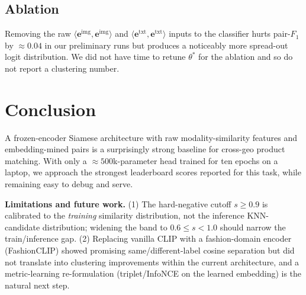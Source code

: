 \documentclass[10pt,conference]{IEEEtran}
\begin{document}
\subsection{Ablation}
Removing the raw $\langle \mathbf{e}^{\text{img}},
\mathbf{e}^{\text{img}}\rangle$ and $\langle \mathbf{e}^{\text{txt}},
\mathbf{e}^{\text{txt}}\rangle$ inputs to the classifier hurts pair-$F_1$
by $\approx 0.04$ in our preliminary runs but produces a noticeably more
spread-out logit distribution. We did not have time to retune
$\theta^\ast$ for the ablation and so do not report a clustering number.

\section{Conclusion}
\label{sec:conclusion}

A frozen-encoder Siamese architecture with raw modality-similarity features
and embedding-mined pairs is a surprisingly strong baseline for cross-geo
product matching. With only a $\approx 500$k-parameter head trained for ten
epochs on a laptop, we approach the strongest leaderboard scores reported
for this task, while remaining easy to debug and serve.

\textbf{Limitations and future work.}
(1) The hard-negative cutoff $s \ge 0.9$ is calibrated to the
\emph{training} similarity distribution, not the inference
KNN-candidate distribution; widening the band to $0.6 \le s < 1.0$ should
narrow the train/inference gap.
(2) Replacing vanilla CLIP with a fashion-domain encoder (FashionCLIP)
showed promising same/different-label cosine separation but did not
translate into clustering improvements within the current architecture, and
a metric-learning re-formulation (triplet/InfoNCE on the learned
embedding) is the natural next step.



\end{document}
